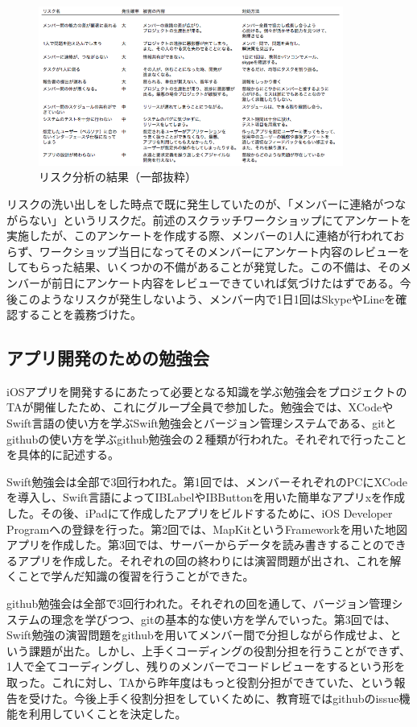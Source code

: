 \documentclass[openany,11pt,papersize]{jsbook}
\begin{document}
\begin{figure}[H]
\begin{center}
\includegraphics[width=10cm, bb=0 0 753 394]{img/RiskManagement.png}
\end{center}
\caption{リスク分析の結果（一部抜粋）}
\end{figure}

\par リスクの洗い出しをした時点で既に発生していたのが、「メンバーに連絡がつながらない」というリスクだ。前述のスクラッチワークショップにてアンケートを実施したが、このアンケートを作成する際、メンバーの1人に連絡が行われておらず、ワークショップ当日になってそのメンバーにアンケート内容のレビューをしてもらった結果、いくつかの不備があることが発覚した。この不備は、そのメンバーが前日にアンケート内容をレビューできていれば気づけたはずである。今後このようなリスクが発生しないよう、メンバー内で1日1回はSkypeやLineを確認することを義務づけた。

\subsection{アプリ開発のための勉強会}
\par iOSアプリを開発するにあたって必要となる知識を学ぶ勉強会をプロジェクトのTAが開催したため、これにグループ全員で参加した。勉強会では、XCodeやSwift言語の使い方を学ぶSwift勉強会とバージョン管理システムである、gitとgithubの使い方を学ぶgithub勉強会の２種類が行われた。それぞれで行ったことを具体的に記述する。
\par Swift勉強会は全部で3回行われた。第1回では、メンバーそれぞれのPCにXCodeを導入し、Swift言語によってIBLabelやIBButtonを用いた簡単なアプリxを作成した。その後、iPadにて作成したアプリをビルドするために、iOS Developer Programへの登録を行った。第2回では、MapKitというFrameworkを用いた地図アプリを作成した。第3回では、サーバーからデータを読み書きすることのできるアプリを作成した。それぞれの回の終わりには演習問題が出され、これを解くことで学んだ知識の復習を行うことができた。
\par github勉強会は全部で3回行われた。それぞれの回を通して、バージョン管理システムの理念を学びつつ、gitの基本的な使い方を学んでいった。第3回では、Swift勉強の演習問題をgithubを用いてメンバー間で分担しながら作成せよ、という課題が出た。しかし、上手くコーディングの役割分担を行うことができず、1人で全てコーディングし、残りのメンバーでコードレビューをするという形を取った。これに対し、TAから昨年度はもっと役割分担ができていた、という報告を受けた。今後上手く役割分担をしていくために、教育班ではgithubのissue機能を利用していくことを決定した。
\end{document}
